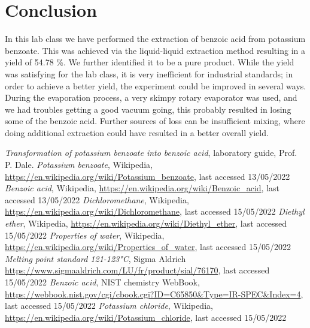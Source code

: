 \documentclass{article}
\begin{document}
\section{Conclusion}

In this lab class we have performed the extraction of benzoic acid from potassium benzoate. This was achieved via the liquid-liquid extraction method resulting in a yield of 54.78 \%. We further identified it to be a pure product. While the yield was satisfying for the lab class, it is very inefficient for industrial standards; in order to achieve a better yield, the experiment could be improved in several ways. During the evaporation process, a very skimpy rotary evaporator was used, and we had troubles getting a good vacuum going, this probably resulted in losing some of the benzoic acid. Further sources of loss can be insufficient mixing, where doing additional extraction could have resulted in a better overall yield.

\begin{thebibliography}{}
     \textit{Transformation of potassium benzoate into benzoic acid}, laboratory guide, Prof. P. Dale.
     \textit{Potassium benzoate}, Wikipedia, \url{https://en.wikipedia.org/wiki/Potassium_benzoate}, last accessed 13/05/2022
     \textit{Benzoic acid}, Wikipedia, \url{https://en.wikipedia.org/wiki/Benzoic_acid}, last accessed 13/05/2022
     \textit{Dichloromethane}, Wikipedia, \url{https://en.wikipedia.org/wiki/Dichloromethane}, last accessed 15/05/2022
     \textit{Diethyl ether}, Wikipedia, \url{https://en.wikipedia.org/wiki/Diethyl_ether}, last accessed 15/05/2022
     \textit{Properties of water}, Wikipedia, \url{https://en.wikipedia.org/wiki/Properties_of_water}, last accessed 15/05/2022
     \textit{Melting point standard 121-123°C}, Sigma Aldrich \url{https://www.sigmaaldrich.com/LU/fr/product/sial/76170}, last accessed 15/05/2022
     \textit{Benzoic acid}, NIST chemistry WebBook, \url{https://webbook.nist.gov/cgi/cbook.cgi?ID=C65850&Type=IR-SPEC&Index=4}, last accessed 15/05/2022
     \textit{Potassium chloride}, Wikipedia, \url{https://en.wikipedia.org/wiki/Potassium_chloride}, last accessed 15/05/2022
\end{thebibliography}
\end{document}
